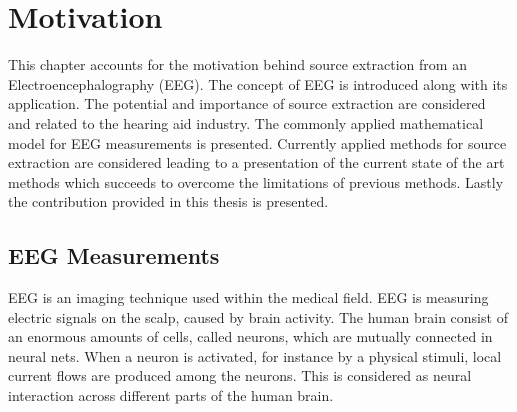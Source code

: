 \chapter{Motivation}\label{ch:motivation}
 This chapter accounts for the motivation behind source extraction from an Electroencephalography (EEG). The concept of EEG is introduced along with its application. The potential and importance of source extraction are considered and related to the hearing aid industry. The commonly applied mathematical model for EEG measurements is presented. Currently applied methods for source extraction are considered leading to a presentation of the current state of the art methods which succeeds to overcome the limitations of previous methods. Lastly the contribution provided in this thesis is presented.          


\section{EEG Measurements}\label{sec:EEG}
EEG is an imaging technique used within the medical field. EEG is measuring electric signals on the scalp, caused by brain activity. 
The human brain consist of an enormous amounts of cells, called neurons, which are mutually connected in neural nets. 
When a neuron is activated, for instance by a physical stimuli, local current flows are produced among the neurons. 
This is considered as neural interaction across different parts of the human brain\cite{fundamentalEEG}.   

